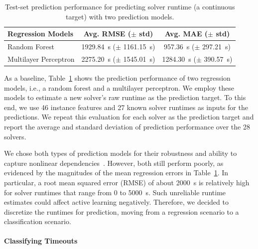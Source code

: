 \documentclass[sn-basic, Numbered]{sn-jnl} %
\begin{document}
\begin{table}[tb]
	\centering
	\caption{Test-set prediction performance for predicting solver runtime (a continuous target) with two prediction models.}
	\label{tab:regression}
	\begin{tabular}{lcc}
		\toprule
		{Regression Models} & {Avg. RMSE ($\pm$ std)} & {Avg. MAE ($\pm$ std)} \\
		\midrule
		Random Forest & \SI{1929.84}{s} ($\pm$ \SI{1161.15}{s}) & \phantom{0}\SI{957.36}{s} ($\pm$ \SI{297.21}{s}) \\[0.4ex]
		Multilayer Perceptron & \SI{2275.20}{s} ($\pm$ \SI{1545.01}{s}) & \SI{1284.30}{s} ($\pm$ \SI{390.57}{s}) \\
		\bottomrule
	\end{tabular}
\end{table}

As a baseline, Table~\ref{tab:regression} shows the prediction performance of two regression models, i.e., a random forest and a multilayer perceptron.
We employ these models to estimate a new solver's raw runtime as the prediction target.
To this end, we use 46 instance features and 27 known solver runtimes as inputs for the predictions.
We repeat this evaluation for each solver as the prediction target and report the average and standard deviation of prediction performance over the 28 solvers.

We chose both types of prediction models for their robustness and ability to capture nonlinear dependencies~\cite{breiman2001random}.
However, both still perform poorly, as evidenced by the magnitudes of the mean regression errors in Table~\ref{tab:regression}.
In particular, a root mean squared error (RMSE) of about \SI{2000}{s} is relatively high for solver runtimes that range from 0 to \SI{5000}{s}.
Such unreliable runtime estimates could affect active learning negatively.
Therefore, we decided to discretize the runtimes for prediction, moving from a regression scenario to a classification scenario.

\paragraph{Classifying Timeouts}
\end{document}
